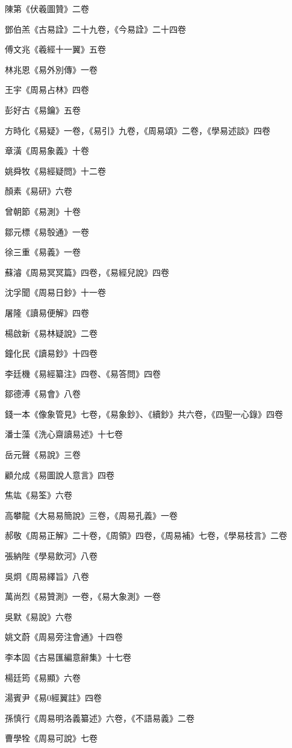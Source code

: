 陳第《伏羲圖贊》二卷

鄧伯羔《古易詮》二十九卷，《今易詮》二十四卷

傅文兆《羲經十一翼》五卷

林兆恩《易外別傳》一卷

王宇《周易占林》四卷

彭好古《易鑰》五卷

方時化《易疑》一卷，《易引》九卷，《周易頌》二卷，《學易述談》四卷

章潢《周易象義》十卷

姚舜牧《易經疑問》十二卷

顏素《易研》六卷

曾朝節《易測》十卷

鄒元標《易彀通》一卷

徐三重《易義》一卷

蘇濬《周易冥冥篇》四卷，《易經兒說》四卷

沈孚聞《周易日鈔》十一卷

屠隆《讀易便解》四卷

楊啟新《易林疑說》二卷

鐘化民《讀易鈔》十四卷

李廷機《易經纂注》四卷、《易答問》四卷

鄒德溥《易會》八卷

錢一本《像象管見》七卷，《易象鈔》、《續鈔》共六卷，《四聖一心錄》四卷

潘士藻《洗心齋讀易述》十七卷

岳元聲《易說》三卷

顧允成《易圖說人意言》四卷

焦竑《易筌》六卷

高攀龍《大易易簡說》三卷，《周易孔義》一卷

郝敬《周易正解》二十卷，《周領》四卷，《周易補》七卷，《學易枝言》二卷

張納陛《學易飲河》八卷

吳炯《周易繹旨》八卷

萬尚烈《易贊測》一卷，《易大象測》一卷

吳默《易說》六卷

姚文蔚《周易旁注會通》十四卷

李本固《古易匯編意辭集》十七卷

楊廷筠《易顯》六卷

湯賓尹《易0經翼註》四卷

孫慎行《周易明洛義纂述》六卷，《不語易義》二卷

曹學牷《周易可說》七卷

